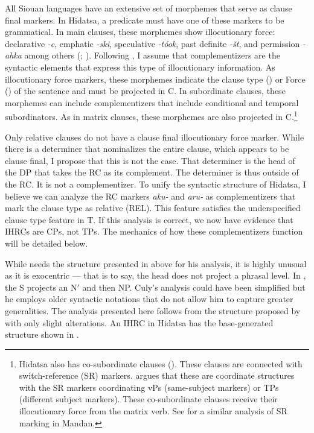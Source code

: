\documentclass[output=paper]{LSP/langsci}
\begin{document}
	All Siouan languages have an extensive set of morphemes that serve as clause final markers. In Hidatsa, a predicate must have one of these markers to be grammatical. In main clauses, these morphemes show illocutionary force: declarative \textit{-c}, emphatic \textit{-ski}, speculative \textit{-t\'ook}, past definite \textit{-\v{s}t}, and permission \textit{-ahka} among others (\citealt{Matthews1965}; \citealt{Boyle2007}). Following \citet{Rizzi1997}, I assume that complementizers are the syntactic elements that express this type of illocutionary information. As illocutionary force markers, these morphemes indicate the clause type (\citealt{Cheng1997}) or Force (\citealt{Chomsky1995}) of the sentence and must be projected in C. In subordinate clauses, these morphemes can include complementizers that include conditional and temporal subordinators. As in matrix clauses, these morphemes are also projected in C.\footnote{Hidatsa also has co-subordinate clauses (\citealt{VanValinLaPolla1997}). These clauses are connected with switch-reference (SR) markers. \citet{Boyle2007} argues that these are coordinate structures with the SR markers coordinating vPs (same-subject markers) or TPs (different subject markers). These co-subordinate clauses receive their illocutionary force from the matrix verb. See \citet{GordonTorres2012} for a similar analysis of SR marking in Mandan.}
	
Only relative clauses do not have a clause final illocutionary force marker.  While there is a determiner that nominalizes the entire clause, which appears to be clause final, I propose that this is not the case. That determiner is the head of the DP that takes the RC as its complement. The determiner is thus outside of the RC. It is not a complementizer. To unify the syntactic structure of Hidatsa, I believe we can analyze the RC markers \textit{aku-} and \textit{aru-} as complementizers that mark the clause type as relative (REL). This feature satisfies the underspecified clause type feature in T. If this analysis is correct, we now have evidence that IHRCs are CPs, not TPs. The mechanics of how these complementizers function will be detailed below.   
	
While \citeauthor{Culy1990} needs the structure presented in  above for his analysis, it is highly unusual as it is exocentric --- that is to say, the head does not project a phrasal level. In , the S projects an N$'$ and then NP. Culy's analysis could have been simplified but he employs older syntactic notations that do not allow him to capture greater generalities. The analysis presented here follows from the structure proposed by \citeauthor{Williamson1987} with only slight alterations. An IHRC in Hidatsa has the base-generated structure shown in . 
\end{document}
